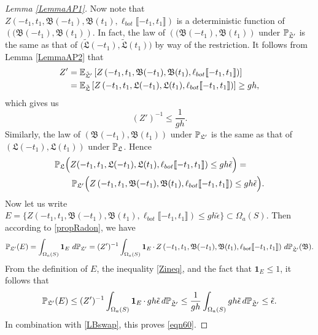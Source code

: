 \begin{proof}[Lemma \ref{LemmaAP1}]
	Now note that $Z\left(-t_1, t_1, \mathfrak B(-t_1), \mathfrak B(t_1), \ell_{bot}\llbracket -t_1, t_1\rrbracket\right)$ is a deterministic function of $\left((\mathfrak B(-t_1), \mathfrak B(t_1)\right)$. In fact, the law of $\left((\mathfrak B(-t_1), \mathfrak B(t_1)\right)$ under $\mathbb{P}_{\tilde{\mathfrak L}'}$ is the same as that of $\big(\tilde{\mathfrak L}(-t_1), \tilde{\mathfrak L}(t_1)\big)$ by way of the restriction. It follows from Lemma \ref{LemmaAP2} that
	\begin{align*}
	Z' &= \mathbb{E}_{\tilde{\mathfrak{L}}'}\left[Z\left(-t_1, t_1, \mathfrak B(-t_1), \mathfrak B(t_1), \ell_{bot}\llbracket -t_1, t_1\rrbracket\right)\right]\\
	&= \mathbb{E}_{\tilde{\mathfrak{L}}}\left[Z\left(-t_1, t_1, \mathfrak L(-t_1), \mathfrak L(t_1), \ell_{bot}\llbracket -t_1, t_1\rrbracket\right)\right]\geq gh,
	\end{align*}
	which gives us 
	\begin{equation}
	\label{Zineq} (Z')^{-1}\leq \frac{1}{gh}.
	\end{equation}
	Similarly,  the law of $\left(\mathfrak B(-t_1), \mathfrak{B}(t_1)\right)$ under $\mathbb{P}_{\mathfrak L'}$ is the same as that of $\left(\mathfrak L(-t_1), \mathfrak L(t_1)\right)$ under $\mathbb{P}_{\mathfrak L}$. Hence
	\begin{equation}\label{LBswap}
	\begin{split}
	&\mathbb{P}_{\mathfrak L}\Big(Z(-t_1, t_1, \mathfrak L(-t_1), \mathfrak L(t_1), \ell_{bot}\llbracket -t_1, t_1\rrbracket)\leq gh\tilde \epsilon\Big)=\\
	&\qquad\mathbb{P}_{\mathfrak L'}\Big(Z\left(-t_1, t_1, \mathfrak B(-t_1), \mathfrak B(t_1), \ell_{bot}\llbracket -t_1, t_1\rrbracket\right)\leq gh\tilde \epsilon\Big).
	\end{split}
	\end{equation}
	Now let us write $E=\{Z\left(-t_1, t_1, \mathfrak B(-t_1), \mathfrak B(t_1), \ell_{bot}\llbracket -t_1, t_1\rrbracket\right)\leq gh\tilde\epsilon\}\subset \Omega_a(S)$. Then according to \eqref{propRadon}, we have
	\[
	\mathbb{P}_{\mathfrak L'}(E)=\int_{\Omega_a(S)} \operatorname{\mathbf{1}}_E\, d\mathbb{P}_{\mathfrak L'} = (Z')^{-1}\int_{\Omega_a(S)}\operatorname{\mathbf{1}}_E \cdot\, Z\left(-t_1, t_1, \mathfrak B(-t_1), \mathfrak B(t_1), \ell_{bot}\llbracket -t_1, t_1\rrbracket\right)\, d\mathbb{P}_{\tilde{\mathfrak{L}}'}(\mathfrak{B}).
	\]
	From the definition of $E$, the inequality \eqref{Zineq}, and the fact that $\mathbf{1}_E \leq 1$, it follows that
	\[
	\mathbb{P}_{\mathfrak L'}(E)\leq (Z')^{-1}\int_{\Omega_a(S)} \operatorname{\mathbf{1}}_E\cdot\, gh\tilde{\epsilon}\, d\mathbb{P}_{\tilde{\mathfrak{L}}'} \leq \frac{1}{gh}\int_{\Omega_a(S)} gh\tilde\epsilon\, d\mathbb{P}_{\tilde{\mathfrak{L}}'}\leq \tilde{\epsilon}.
	\]
	In combination with \eqref{LBswap}, this proves \eqref{eqn60}.
	
\end{proof}

